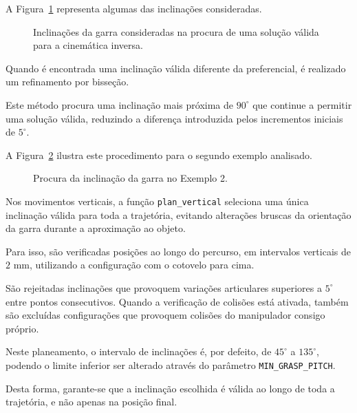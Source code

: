 A Figura~\ref{fig:inclinacao} representa algumas das inclinações consideradas.

\begin{figure}[htbp]
    \centering
    \resizebox{0.65\textwidth}{!}{
        
    }
    \caption{Inclinações da garra consideradas na procura de uma solução válida para a cinemática inversa.}
    \label{fig:inclinacao}
\end{figure}

Quando é encontrada uma inclinação válida diferente da preferencial, é realizado um refinamento por bisseção.

Este método procura uma inclinação mais próxima de $90^\circ$ que continue a permitir uma solução válida, reduzindo a diferença introduzida pelos incrementos iniciais de $5^\circ$.

A Figura~\ref{fig:bissecao} ilustra este procedimento para o segundo exemplo analisado.

\begin{figure}[H]
    \centering
    
    \caption{Procura da inclinação da garra no Exemplo 2.}
    \label{fig:bissecao}
\end{figure}

Nos movimentos verticais, a função \texttt{plan\_vertical} seleciona uma única inclinação válida para toda a trajetória, evitando alterações bruscas da orientação da garra durante a aproximação ao objeto.

Para isso, são verificadas posições ao longo do percurso, em intervalos verticais de $2$ mm, utilizando a configuração com o cotovelo para cima.

São rejeitadas inclinações que provoquem variações articulares superiores a $5^\circ$ entre pontos consecutivos. Quando a verificação de colisões está ativada, também são excluídas configurações que provoquem colisões do manipulador consigo próprio.

Neste planeamento, o intervalo de inclinações é, por defeito, de $45^\circ$ a $135^\circ$, podendo o limite inferior ser alterado através do parâmetro \texttt{MIN\_GRASP\_PITCH}.

Desta forma, garante-se que a inclinação escolhida é válida ao longo de toda a trajetória, e não apenas na posição final.
